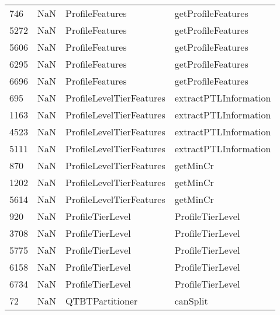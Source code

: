 \begin{tabular}{llll}
746  &                   NaN &            ProfileFeatures &                        getProfileFeatures \\
5272 &                   NaN &            ProfileFeatures &                        getProfileFeatures \\
5606 &                   NaN &            ProfileFeatures &                        getProfileFeatures \\
6295 &                   NaN &            ProfileFeatures &                        getProfileFeatures \\
6696 &                   NaN &            ProfileFeatures &                        getProfileFeatures \\
695  &                   NaN &   ProfileLevelTierFeatures &                     extractPTLInformation \\
1163 &                   NaN &   ProfileLevelTierFeatures &                     extractPTLInformation \\
4523 &                   NaN &   ProfileLevelTierFeatures &                     extractPTLInformation \\
5111 &                   NaN &   ProfileLevelTierFeatures &                     extractPTLInformation \\
870  &                   NaN &   ProfileLevelTierFeatures &                                  getMinCr \\
1202 &                   NaN &   ProfileLevelTierFeatures &                                  getMinCr \\
5614 &                   NaN &   ProfileLevelTierFeatures &                                  getMinCr \\
920  &                   NaN &           ProfileTierLevel &                          ProfileTierLevel \\
3708 &                   NaN &           ProfileTierLevel &                          ProfileTierLevel \\
5775 &                   NaN &           ProfileTierLevel &                          ProfileTierLevel \\
6158 &                   NaN &           ProfileTierLevel &                          ProfileTierLevel \\
6734 &                   NaN &           ProfileTierLevel &                          ProfileTierLevel \\
72   &                   NaN &            QTBTPartitioner &                                  canSplit \\

\end{tabular}
